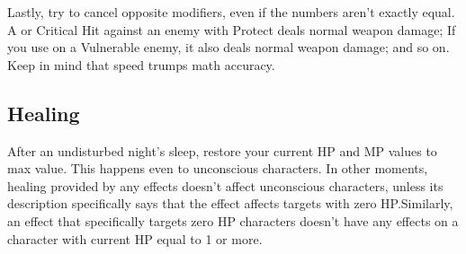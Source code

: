 \begin{multicols}{2}
\begin{boco}
Lastly, try to cancel opposite modifiers, even if the numbers aren't exactly equal. A  or Critical Hit against an enemy with Protect deals normal weapon damage; If you use  on a Vulnerable enemy, it also deals normal weapon damage; and so on. Keep in mind that speed trumps math accuracy.
\end{boco}

\subsection{Healing}\label{subsec:heal}
After an undisturbed night's sleep, restore your current HP and MP values to max value. This happens even to unconscious characters. In other moments, healing provided by any effects doesn’t affect unconscious characters, unless its description specifically says that the effect affects targets with zero HP.\@{}Similarly, an effect that specifically targets zero HP characters doesn’t have any effects on a character with current HP equal to 1 or more.
\end{multicols}

